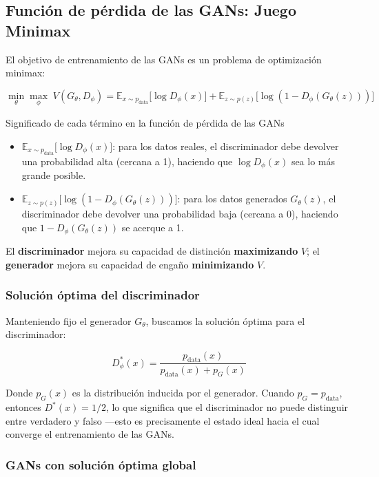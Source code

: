 \documentclass[a4paper]{article}
\begin{document}
\subsection{Función de pérdida de las GANs: Juego Minimax}

El objetivo de entrenamiento de las GANs es un problema de optimización minimax:

$$\min_\theta \max_\phi \; V(G_\theta, D_\phi) = \mathbb{E}_{x \sim p_{\text{data}}} {[}\log D_\phi(x){]} + \mathbb{E}_{z \sim p(z)} {[}\log(1 - D_\phi(G_\theta(z))){]}$$

\begin{importantbox}{Significado de cada término en la función de pérdida de las GANs}
\begin{itemize}
    \item $\mathbb{E}_{x \sim p_{\text{data}}} {[}\log D_\phi(x){]}$: para los datos reales, el discriminador debe devolver una probabilidad alta (cercana a 1), haciendo que $\log D_\phi(x)$ sea lo más grande posible.
    \item $\mathbb{E}_{z \sim p(z)} {[}\log(1 - D_\phi(G_\theta(z))){]}$: para los datos generados $G_\theta(z)$, el discriminador debe devolver una probabilidad baja (cercana a 0), haciendo que $1 - D_\phi(G_\theta(z))$ se acerque a 1.
\end{itemize}
El \textbf{discriminador} mejora su capacidad de distinción \textbf{maximizando} $V$; el \textbf{generador} mejora su capacidad de engaño \textbf{minimizando} $V$.
\end{importantbox}

\subsubsection{Solución óptima del discriminador}

Manteniendo fijo el generador $G_\theta$, buscamos la solución óptima para el discriminador:

$$D^*_\phi(x) = \frac{p_{\text{data}}(x)}{p_{\text{data}}(x) + p_G(x)}$$

Donde $p_G(x)$ es la distribución inducida por el generador. Cuando $p_G = p_{\text{data}}$, entonces $D^*(x) = 1/2$, lo que significa que el discriminador no puede distinguir entre verdadero y falso —esto es precisamente el estado ideal hacia el cual converge el entrenamiento de las GANs.

\subsubsection{GANs con solución óptima global}
\end{document}
